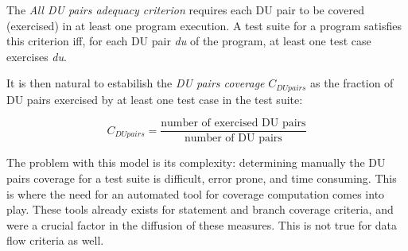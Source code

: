 The \textit{All DU pairs adequacy criterion} requires each DU pair to be covered 
(exercised) in at least one program execution. A test suite for a program 
satisfies this criterion iff, for each DU pair \textit{du} of the program, at least one test 
case exercises \textit{du}.

It is then natural to estabilish the \textit{DU pairs coverage} $C_{DU pairs}$ 
as the fraction of DU pairs exercised by at least one test case in the test 
suite:
\begin{center}
$$
C_{DU pairs} = \frac{\text{number of exercised DU pairs}}{\text{number of DU pairs}}
$$
\end{center}

The problem with this model is its complexity: determining manually the DU pairs 
coverage for a test suite is difficult, error prone, and time consuming. This is 
where the need for an automated tool for coverage computation comes into play. 
These tools already exists for statement and branch coverage criteria, and were a crucial factor in
the diffusion of these measures. This is not true for data flow criteria as well. 
\\\\


 



